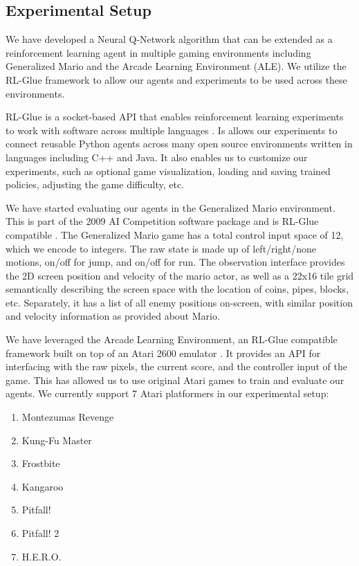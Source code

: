 \documentclass{article}
\begin{document}
\subsection{Experimental Setup}

We have developed a Neural Q-Network algorithm that can be extended as a reinforcement learning agent in multiple gaming environments including Generalized Mario and the Arcade Learning Environment (ALE). We utilize the RL-Glue framework to allow our agents and experiments to be used across these environments.

RL-Glue is a socket-based API that enables reinforcement learning experiments to work with software across multiple languages \cite{Tanner09}. Is allows our experiments to connect reusable Python agents across many open source environments written in languages including C++ and Java. It also enables us to customize our experiments, such as optional game visualization, loading and saving trained policies, adjusting the game difficulty, etc.

We have started evaluating our agents in the Generalized Mario environment. This is part of the 2009 AI Competition software package and is RL-Glue compatible \cite{Togelius10}. The Generalized Mario game has a total control input space of 12, which we encode to integers. The raw state is made up of left/right/none motions, on/off for jump, and on/off for run. The observation interface provides the 2D screen position and velocity of the mario actor, as well as a 22x16 tile grid semantically describing the screen space with the location of coins, pipes, blocks, etc. Separately, it has a list of all enemy positions on-screen, with similar position and velocity information as provided about Mario. 

We have leveraged the Arcade Learning Environment, an RL-Glue compatible framework built on top of an Atari 2600 emulator \cite{bellemare13}.  It provides an API for interfacing with the raw pixels, the current score, and the controller input of the game. This has allowed us to use original Atari games to train and evaluate our agents. We currently support 7 Atari platformers in our experimental setup:

\begin{multicols}{2}
\begin{enumerate} [topsep=0pt,itemsep=-1ex,partopsep=1ex,parsep=1ex]
\item Montezumas Revenge
\item Kung-Fu Master
\item Frostbite
\item Kangaroo
\item Pitfall!
\item Pitfall! 2
\item H.E.R.O.
\end{enumerate}
\end{multicols}
\end{document}
